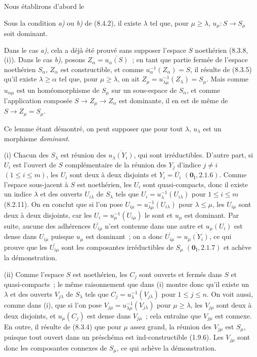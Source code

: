 Nous établirons d'abord le

\begin{lemma}[8.4.2.1]
\label{IV.8.4.2.1-fr}
Sous la condition \emph{a)} ou \emph{b)} de \textup{(8.4.2)}, il existe $\lambda$ tel
que, pour $\mu\geq\lambda$, $u_\mu:S\to S_\mu$ soit dominant.
\end{lemma}

Dans le cas \emph{a)}, cela a déjà été prouvé sans supposer l'espace $S$
noethérien (8.3.8, (i)). Dans le cas \emph{b)}, posons
$Z_\alpha=\overline{u_\alpha(S)}$~; en tant que partie fermée de l'espace
noethérien $S_\alpha$, $Z_\alpha$ est constructible, et comme
$u_\alpha^{-1}(Z_\alpha)=S$, il résulte de (8.3.5) qu'il existe
$\lambda\geq\alpha$ tel que, pour $\mu\geq\lambda$, on ait
$Z_\mu=u_{\lambda\mu}^{-1}(Z_\lambda)=S_\mu$. Mais comme $u_{\alpha\mu}$ est
un homéomorphisme de $S_\mu$ sur un sous-espace de $S_\alpha$, et comme
l'application composée $S\to Z_\mu\to Z_\alpha$ est dominante, il en est de
même de $S\to Z_\mu=S_\mu$.

Ce lemme étant démontré, on peut supposer que pour tout $\lambda$,
$u_\lambda$ est un morphisme \emph{dominant}.

\medskip
\noindent
(i) Chacun des $S_\lambda$ est réunion des
$\overline{u_\lambda(Y_i)}$, qui sont irréductibles. D'autre part, si $U_i$
est l'ouvert de $S$ complémentaire de la réunion des $Y_j$ d'indice $j\neq i$
$(1\leq i\leq m)$, les $U_i$ sont deux à deux disjoints et
$Y_i=\overline{U_i}$ $(\mathbf{0}_{\mathrm I},2.1.6)$. Comme l'espace sous-jacent à
$S$ est noethérien, les $U_i$ sont quasi-compacts, donc il existe un indice
$\lambda$ et des ouverts $U_{i\lambda}$ de $S_\lambda$ tels que
$U_i=u_\lambda^{-1}(U_{i\lambda})$ pour $1\leq i\leq m$ (8.2.11). On en
conclut que si l'on pose
$U_{i\mu}=u_{\lambda\mu}^{-1}(U_{i\lambda})$ pour $\lambda\leq\mu$, les
$U_{i\mu}$ sont deux à deux disjoints, car les
$U_i=u_\mu^{-1}(U_{i\mu})$ le sont et $u_\mu$ est dominant. Par suite,
aucune des adhérences $\overline{U_{i\mu}}$ n'est contenue dans une autre et
$u_\mu(U_i)$ est dense dans $U_{i\mu}$ puisque $u_\mu$ est dominant~; on a
donc
$\overline{U_{i\mu}}=\overline{u_\mu(Y_i)}$, ce qui prouve que les
$\overline{U_{i\mu}}$ sont les composantes irréductibles de $S_\mu$
$(\mathbf{0}_{\mathrm I},2.1.7)$ et achève la démonstration.

\medskip
\noindent
(ii) Comme l'espace $S$ est noethérien, les $C_j$ sont ouverts et fermés dans
$S$ et quasi-compacts~; le même raisonnement que dans (i) montre donc qu'il
existe un $\lambda$ et des ouverts $V_{j\lambda}$ de $S_\lambda$ tels que
$C_j=u_\lambda^{-1}(V_{j\lambda})$ pour $1\leq j\leq n$. On voit aussi,
comme dans (i), que si l'on pose
$V_{j\mu}=u_{\lambda\mu}^{-1}(V_{j\lambda})$ pour $\mu\geq\lambda$, les
$V_{j\mu}$ sont deux à deux disjoints, et $u_\mu(C_j)$ est dense dans
$V_{j\mu}$~; cela entraîne que $V_{j\mu}$ est connexe. En outre, il résulte
de (8.3.4) que pour $\mu$ assez grand, la réunion des $V_{j\mu}$ est
$S_\mu$, puisque tout ouvert dans un préschéma est ind-constructible (1.9.6).
Les $V_{j\mu}$ sont donc les composantes connexes de $S_\mu$, ce qui achève
la démonstration.

